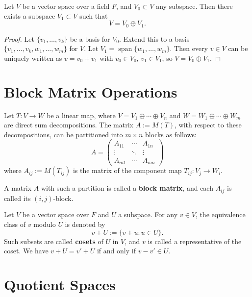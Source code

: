 \begin{proposition}
  Let $V$ be a vector space over a field $F$, and $V_0 \subset V$ any subspace. Then there exists a subspace $V_1 \subset V$ such that
  \[
    V = V_0 \oplus V_1.
  \]
\end{proposition}

\begin{proof}
  Let $\{v_1, \ldots, v_k\}$ be a basis for $V_0$. Extend this to a basis $\{v_1, \ldots, v_k, w_1, \ldots, w_m\}$ for $V$. Let $V_1 = \operatorname{span}\{w_1, \ldots, w_m\}$. Then every $v \in V$ can be uniquely written as $v = v_0 + v_1$ with $v_0 \in V_0$, $v_1 \in V_1$, so $V = V_0 \oplus V_1$.
\end{proof}

\section{Block Matrix Operations}

\begin{definition}
  Let $T: V \to W$ be a linear map, where $V = V_1 \oplus \cdots \oplus V_n$ and $W = W_1 \oplus \cdots \oplus W_m$ are direct sum decompositions. The matrix $A := M(T)$, with respect to these decompositions, can be partitioned into $m \times n$ blocks as follows:
  \[
    A =
    \begin{pmatrix}
      A_{11} & \cdots & A_{1n} \\
      \vdots & \ddots & \vdots \\
      A_{m1} & \cdots & A_{mn}
    \end{pmatrix}
  \]
  where $A_{ij} := M(T_{ij})$ is the matrix of the component map $T_{ij}: V_j \to W_i$.

  A matrix $A$ with such a partition is called a \textbf{block matrix}, and each $A_{ij}$ is called its $(i,j)$-block.
\end{definition}

Let $V$ be a vector space over $F$ and $U$ a subspace. For any $v \in V$, the equivalence class of $v$ modulo $U$ is denoted by
\[
  v + U := \{ v + u : u \in U \}.
\]
Such subsets are called \textbf{cosets} of $U$ in $V$, and $v$ is called a representative of the coset. We have $v + U = v' + U$ if and only if $v - v' \in U$.

\section{Quotient Spaces}

